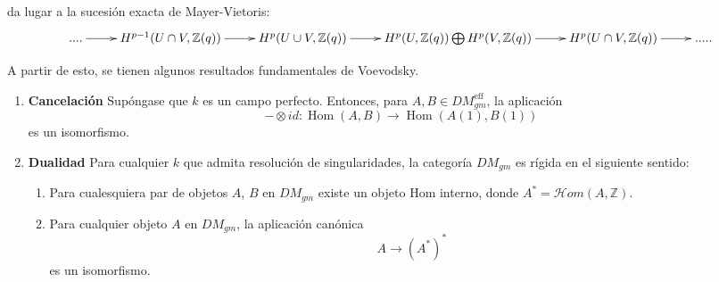 \documentclass[10pt]{amsart}
\theoremstyle{definition}
\theoremstyle{remark}
\theoremstyle{definition}
\begin{document}
da lugar a la sucesión exacta de Mayer-Vietoris:
\begin{equation*}
 \xymatrix{ .... \ar[r] & H^{p-1}(U \cap V, \mathbb{Z}(q)) \ar[r] & H^{p}(U \cup V, \mathbb{Z}(q))\ar[r] & 
H^p(U, \mathbb{Z}(q)) \bigoplus H^{p}(V, \mathbb{Z}(q))\ar[r] & H^{p}(U \cap V, \mathbb{Z}(q)) \ar[r] & ..... }
\end{equation*}

A partir de esto, se tienen algunos resultados fundamentales de Voevodsky.
\begin{enumerate}
\item \textbf{Cancelación} Supóngase que $\mathit{k}$ es un campo perfecto. Entonces, para $A, B \in DM^{\mathrm{eff}}_{gm}$, la aplicación
\begin{equation*}
-\otimes id:\operatorname{Hom}(A,B) \rightarrow \operatorname{Hom}(A(1),B(1))
\end{equation*}
es un isomorfismo.

 \item \textbf{Dualidad} Para cualquier $\mathit{k}$ que admita resolución de singularidades, la categoría $DM_{gm}$ es rígida en el siguiente sentido:
\begin{enumerate} 
\item Para cualesquiera par de objetos $A$, $B$ en $DM_{gm}$ existe un objeto Hom interno, donde $A^{*}=\mathcal{H}om(A, \mathbb{Z})$.
\item Para cualquier objeto $A$ en $DM_{gm}$, la aplicación canónica
\begin{equation*}
A \rightarrow (A^{*})^{*}
\end{equation*}
es un isomorfismo.
\end{enumerate}
\end{enumerate}
\end{document}
